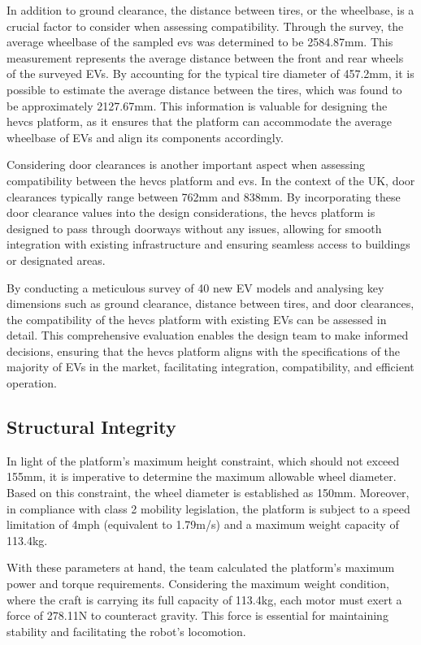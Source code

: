 \documentclass [12pt]{article}
\begin{document}
In addition to ground clearance, the distance between tires, or the wheelbase, is a crucial factor to consider when assessing compatibility. Through the survey, the average wheelbase of the sampled \gls{ev}s was determined to be 2584.87mm. This measurement represents the average distance between the front and rear wheels of the surveyed EVs. By accounting for the typical tire diameter of 457.2mm, it is possible to estimate the average distance between the tires, which was found to be approximately 2127.67mm. This information is valuable for designing the \gls{hevcs} platform, as it ensures that the platform can accommodate the average wheelbase of EVs and align its components accordingly.

Considering door clearances is another important aspect when assessing compatibility between the \gls{hevcs} platform and \gls{ev}s. In the context of the UK, door clearances typically range between 762mm and 838mm. By incorporating these door clearance values into the design considerations, the \gls{hevcs} platform is designed to pass through doorways without any issues, allowing for smooth integration with existing infrastructure and ensuring seamless access to buildings or designated areas.

By conducting a meticulous survey of 40 new EV models and analysing key dimensions such as ground clearance, distance between tires, and door clearances, the compatibility of the \gls{hevcs} platform with existing EVs can be assessed in detail. This comprehensive evaluation enables the design team to make informed decisions, ensuring that the \gls{hevcs} platform aligns with the specifications of the majority of EVs in the market, facilitating integration, compatibility, and efficient operation.

\subsection{Structural Integrity}

In light of the platform's maximum height constraint, which should not exceed 155mm, it is imperative to determine the maximum allowable wheel diameter. Based on this constraint, the wheel diameter is established as 150mm. Moreover, in compliance with class 2 mobility legislation, the platform is subject to a speed limitation of 4mph (equivalent to 1.79m/s) and a maximum weight capacity of 113.4kg.

With these parameters at hand, the team calculated the platform's maximum power and torque requirements. Considering the maximum weight condition, where the craft is carrying its full capacity of 113.4kg, each motor must exert a force of 278.11N to counteract gravity. This force is essential for maintaining stability and facilitating the robot's locomotion.
\end{document}
